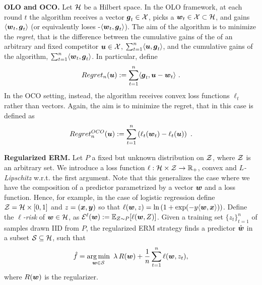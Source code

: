 \vspace{0.2cm}\noindent\textbf{\ac{OLO} and \ac{OCO}.}
Let $\mathcal{H}$ be a Hilbert space. In the \ac{OLO} framework, at each round $t$ the algorithm receives a vector $\boldsymbol{g}_t \in \mathcal{X}$, picks a $\boldsymbol{w}_t \in \mathcal{X} \subset \mathcal{H}$, and gains $\langle \boldsymbol{w}_t,\boldsymbol{g}_t \rangle$ (or equivalently loses -$\langle \boldsymbol{w}_t,\boldsymbol{g}_t \rangle$).
The aim of the algorithm is to minimize the \emph{regret}, that is the difference between the cumulative gains of the 
of an arbitrary and fixed competitor $\boldsymbol{u} \in \mathcal{X}$, $\sum_{t=1}^n \langle \boldsymbol{u},\boldsymbol{g}_t \rangle$, and 
the cumulative gains of the algorithm, $\sum_{t=1}^n \langle \boldsymbol{w}_t,\boldsymbol{g}_t \rangle$.
In particular, define
\[
Regret_n(\boldsymbol{u}) := \sum_{t=1}^n \langle \boldsymbol{g}_t , \boldsymbol{u} - \boldsymbol{w}_t \rangle~.
\]
In the \ac{OCO} setting, instead, the algorithm receives convex loss functions $\ell_t$ rather than vectors.
Again, the aim is to minimize the regret, that in this case is defined as
\[
Regret^{OCO}_n(\boldsymbol{u}) := \sum_{t=1}^n \left(\ell_t(\boldsymbol{w}_t) -\ell_t(\boldsymbol{u})\right)~.
\]

\vspace{0.2cm}\noindent\textbf{Regularized ERM.}
Let $P$ a fixed but unknown distribution on $\mathcal{Z}$, where $\mathcal{Z}$ is an arbitrary set.
We introduce a loss function  $\ell: \mathcal{H} \times \mathcal{Z} \rightarrow \mathbb{R}_+$, convex and \emph{$L$-Lipschitz} w.r.t. the first argument.
Note that this generalizes the case where we have the composition of a predictor parametrized by a vector $\boldsymbol{w}$ and a loss function. Hence, for example, in the case of logistic regression define $\mathcal{Z}= \mathcal{H} \times [0,1]$ and $z=(\boldsymbol{x},\boldsymbol{y})$ so that
$\ell(\boldsymbol{w},z)=\ln\left(1+\exp(- y \langle \boldsymbol{w}, \boldsymbol{x}\rangle)\right)$.
Define the \emph{$\ell$-risk} of $\boldsymbol{w} \in \mathcal{H}$, as $\mathcal{E}^{\ell}(\boldsymbol{w}):=\mathbb{E}_{Z \sim P} [\ell(\boldsymbol{w},Z)]$.
Given a training set $\{z_t\}_{t=1}^n$ of samples drawn \ac{IID} from $P$, the regularized \ac{ERM} strategy finds a predictor $\hat{\boldsymbol{w}}$ in a subset $\mathcal{S} \subseteq \mathcal{H}$, such that
\[
\hat{f}= \argmin_{\bw \in \mathcal{S}} \ \lambda\, R(\bw) + \frac{1}{n} \sum_{t=1}^n \ell(\bw,z_t),
\]
where $R(\boldsymbol{w})$ is the regularizer.